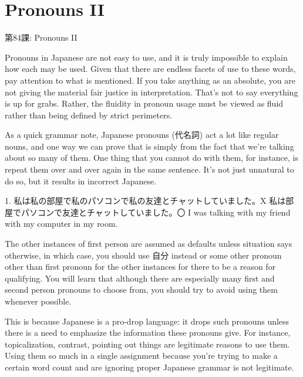     
\chapter{Pronouns II}

\begin{center}
\begin{Large}
第84課: Pronouns II 
\end{Large}
\end{center}
 
\par{ Pronouns in Japanese are not easy to use, and it is truly impossible to explain how each may be used. Given that there are endless facets of use to these words, pay attention to what is mentioned. If you take anything as an absolute, you are not giving the material fair justice in interpretation. That's not to say everything is up for grabs. Rather, the fluidity in pronoun usage must be viewed as fluid rather than being defined by strict perimeters. }

\par{ As a quick grammar note, Japanese pronouns (代名詞) act a lot like regular nouns, and one way we can prove that is simply from the fact that we're talking about so many of them. One thing that you cannot do with them, for instance, is repeat them over and over again in the same sentence. It's not just unnatural to do so, but it results in incorrect Japanese. }

\par{1. 私は私の部屋で私のパソコンで私の友達とチャットしていました。X \hfill\break
私は部屋でパソコンで友達とチャットしていました。〇 \hfill\break
I was talking with my friend with my computer in my room. }

\par{ The other instances of first person are assumed as defaults unless situation says otherwise, in which case, you should use 自分 instead or some other pronoun other than first pronoun for the other instances for there to be a reason for qualifying. You will learn that although there are especially many first and second person pronouns to choose from, you should try to avoid using them whenever possible. }

\par{ This is because Japanese is a pro-drop language: it drops such pronouns unless there is a need to emphasize the information these pronouns give. For instance, topicalization, contrast, pointing out things are legitimate reasons to use them. Using them so much in a single assignment because you're trying to make a certain word count and are ignoring proper Japanese grammar is not legitimate.  }
      
